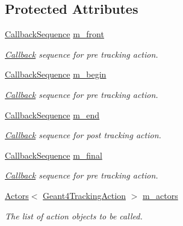 \subsection*{Protected Attributes}
\begin{DoxyCompactItemize}
\item 
\hyperlink{struct_d_d4hep_1_1_callback_sequence}{Callback\+Sequence} \hyperlink{class_d_d4hep_1_1_simulation_1_1_geant4_tracking_action_sequence_a7d0b671eddcd31052c3b86965529e962}{m\+\_\+front}
\begin{DoxyCompactList}\small\item\em \hyperlink{class_d_d4hep_1_1_callback}{Callback} sequence for pre tracking action. \end{DoxyCompactList}\item 
\hyperlink{struct_d_d4hep_1_1_callback_sequence}{Callback\+Sequence} \hyperlink{class_d_d4hep_1_1_simulation_1_1_geant4_tracking_action_sequence_a60424cd706472478d3c4e2f5d78f9540}{m\+\_\+begin}
\begin{DoxyCompactList}\small\item\em \hyperlink{class_d_d4hep_1_1_callback}{Callback} sequence for pre tracking action. \end{DoxyCompactList}\item 
\hyperlink{struct_d_d4hep_1_1_callback_sequence}{Callback\+Sequence} \hyperlink{class_d_d4hep_1_1_simulation_1_1_geant4_tracking_action_sequence_ae7d724d09c2f2cd087d72bd448b41f79}{m\+\_\+end}
\begin{DoxyCompactList}\small\item\em \hyperlink{class_d_d4hep_1_1_callback}{Callback} sequence for post tracking action. \end{DoxyCompactList}\item 
\hyperlink{struct_d_d4hep_1_1_callback_sequence}{Callback\+Sequence} \hyperlink{class_d_d4hep_1_1_simulation_1_1_geant4_tracking_action_sequence_abaca2784eae1ab5e30a742819e61b3be}{m\+\_\+final}
\begin{DoxyCompactList}\small\item\em \hyperlink{class_d_d4hep_1_1_callback}{Callback} sequence for pre tracking action. \end{DoxyCompactList}\item 
\hyperlink{class_d_d4hep_1_1_simulation_1_1_geant4_action_1_1_actors}{Actors}$<$ \hyperlink{class_d_d4hep_1_1_simulation_1_1_geant4_tracking_action}{Geant4\+Tracking\+Action} $>$ \hyperlink{class_d_d4hep_1_1_simulation_1_1_geant4_tracking_action_sequence_a198136b8ba82d7de2c4d94e631b79970}{m\+\_\+actors}
\begin{DoxyCompactList}\small\item\em The list of action objects to be called. \end{DoxyCompactList}\end{DoxyCompactItemize}
